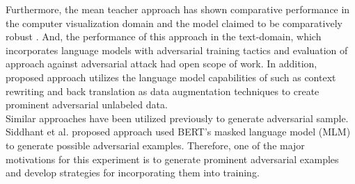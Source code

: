 \documentclass[%
	BCOR=8mm, %
	DIV=12,
	toc=bibliography, %
	toc=listof, %
	oneside, %
	egregdoesnotlikesansseriftitles, %
	]{scrbook}
\begin{document}
Furthermore, the mean teacher approach has shown comparative performance in the computer visualization domain and the model claimed to be comparatively robust \cite{tarvainen_mean_2018}. And, the performance of this approach in the text-domain, which incorporates language models with adversarial training tactics  and evaluation of approach against adversarial attack had open scope of work. In addition, proposed approach utilizes the language model capabilities of such as context rewriting and back translation as data augmentation techniques to create prominent adversarial unlabeled data. \\
Similar approaches have been utilized previously to generate adversarial sample. Siddhant et al.  \cite{garg_bae_2020}  proposed approach used BERT's masked language model (MLM) to generate possible adversarial examples. Therefore, one of the major motivations for this experiment is to generate prominent adversarial examples and develop strategies for incorporating them into training.
\end{document}
